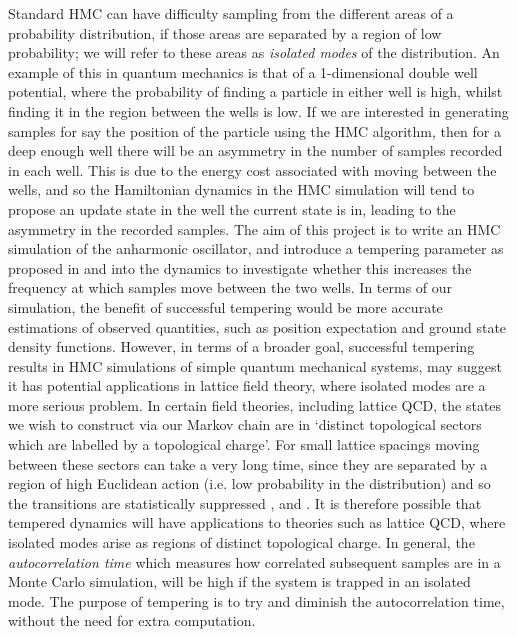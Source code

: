 \documentclass[12pt]{article}
\begin{document}
 Standard HMC can have difficulty sampling from the different areas of a probability distribution, if those areas are separated by a region of low probability; we will refer to these areas as \textit{isolated modes} of the distribution. An example of this in quantum mechanics is that of a 1-dimensional double well potential, where the probability of finding a particle in either well is high, whilst finding it in the region between the wells is low. If we are interested in generating samples for say the position of the particle using the HMC algorithm, then for a deep enough well there will be an asymmetry in the number of samples recorded in each well. This is due to the energy cost associated with moving between the wells, and so the Hamiltonian dynamics in the HMC simulation will tend to propose an update state in the well the current state is in, leading to the asymmetry in the recorded samples. The aim of this project is to write an HMC simulation of the anharmonic oscillator, and introduce a tempering parameter as proposed in \cite{neal_2011} and \cite{neal_1996_b} into the dynamics to investigate whether this increases the frequency at which samples move between the two wells. In terms of our simulation, the benefit of successful tempering would be more accurate estimations of observed quantities, such as position expectation and ground state density functions. However, in terms of a broader goal, successful tempering results in HMC simulations of simple quantum mechanical systems, may suggest it has potential applications in lattice field theory, where isolated modes are a more serious problem. In certain field theories, including lattice QCD, the states we wish to construct via our Markov chain are in `distinct topological sectors which are labelled by a topological charge'\cite{bietenholz_2016}. For small lattice spacings moving between these sectors can take a very long time, since they are separated by a region of high Euclidean action (i.e. low probability in the distribution) and so the transitions are statistically suppressed \cite{bietenholz_2016}, \cite{debbio_panagopoulos_vicari_2002} and \cite{debbio_manca_vicari_2004}. It is therefore possible that tempered dynamics will have applications to theories such as lattice QCD, where isolated modes arise as regions of distinct topological charge. In general, the \textit{autocorrelation time} which measures how correlated subsequent samples are in a Monte Carlo simulation, will be high if the system is trapped in an isolated mode. The purpose of tempering is to try and diminish the autocorrelation time, without the need for extra computation. 
\end{document}
